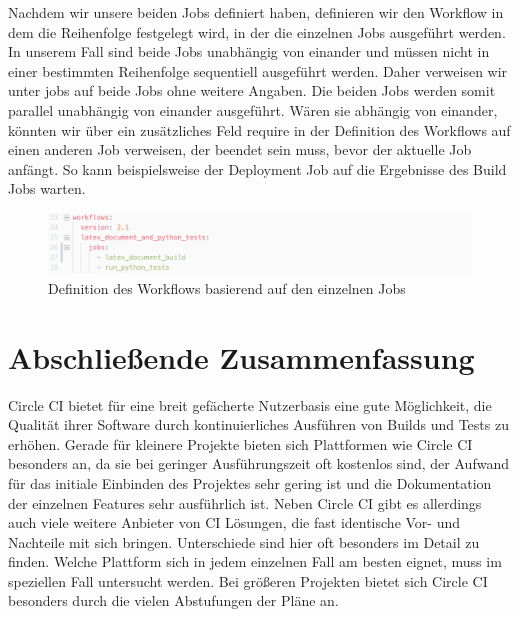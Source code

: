 \documentclass[11pt]{article}
\begin{document}
Nachdem wir unsere beiden Jobs definiert haben, definieren wir den Workflow in dem die Reihenfolge festgelegt wird, in der die einzelnen Jobs ausgeführt werden. In unserem Fall sind beide Jobs unabhängig von einander und müssen nicht in einer bestimmten Reihenfolge sequentiell ausgeführt werden. Daher verweisen wir unter jobs auf beide Jobs ohne weitere Angaben. Die beiden Jobs werden somit parallel unabhängig von einander ausgeführt. Wären sie abhängig von einander, könnten wir über ein zusätzliches Feld require in der Definition des Workflows auf einen anderen Job verweisen, der beendet sein muss, bevor der aktuelle Job anfängt. So kann beispielsweise der Deployment Job auf die Ergebnisse des Build Jobs warten.

\begin{figure}[H]
	\centering
  	\includegraphics[width=1\linewidth]{../Images/Config/Workflow}
  	\caption{Definition des Workflows basierend auf den einzelnen Jobs}
  	\label{fig:workflow}
\end{figure}

\section{Abschließende Zusammenfassung}
Circle CI bietet für eine breit gefächerte Nutzerbasis eine gute Möglichkeit, die Qualität ihrer Software durch kontinuierliches Ausführen von Builds und Tests zu erhöhen. Gerade für kleinere Projekte bieten sich Plattformen wie Circle CI besonders an, da sie bei geringer Ausführungszeit oft kostenlos sind, der Aufwand für das initiale Einbinden des Projektes sehr gering ist und die Dokumentation der einzelnen Features sehr ausführlich ist. Neben Circle CI gibt es allerdings auch viele weitere Anbieter von CI Lösungen, die fast identische Vor- und Nachteile mit sich bringen. Unterschiede sind hier oft besonders im Detail zu finden. Welche Plattform sich in jedem einzelnen Fall am besten eignet, muss im speziellen Fall untersucht werden.
Bei größeren Projekten bietet sich Circle CI besonders durch die vielen Abstufungen der Pläne an.
\end{document}
